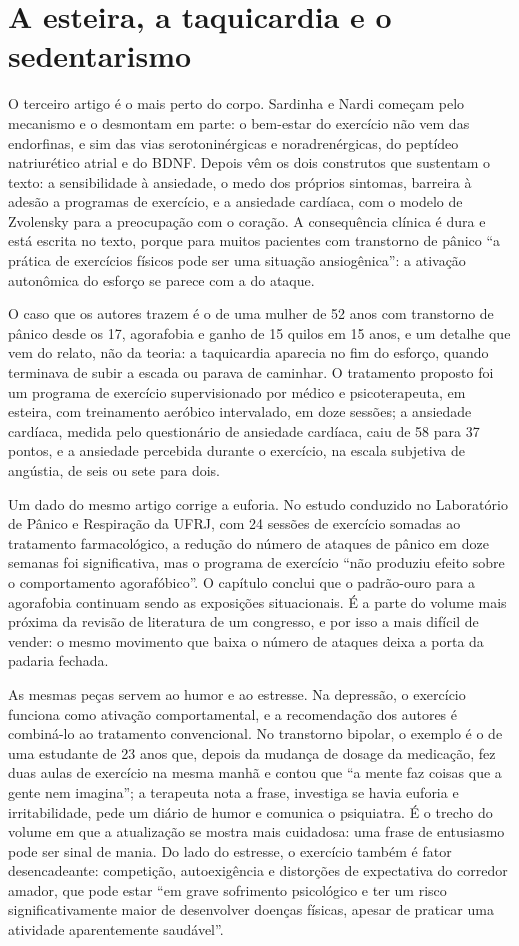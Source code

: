 \documentclass[12pt]{article}
\begin{document}
\section{A esteira, a taquicardia e o sedentarismo}

O terceiro artigo é o mais perto do corpo. Sardinha e Nardi começam pelo mecanismo e o desmontam em parte: o bem-estar do exercício não vem das endorfinas, e sim das vias serotoninérgicas e noradrenérgicas, do peptídeo natriurético atrial e do BDNF. Depois vêm os dois construtos que sustentam o texto: a sensibilidade à ansiedade, o medo dos próprios sintomas, barreira à adesão a programas de exercício, e a ansiedade cardíaca, com o modelo de Zvolensky para a preocupação com o coração. A consequência clínica é dura e está escrita no texto, porque para muitos pacientes com transtorno de pânico ``a prática de exercícios físicos pode ser uma situação ansiogênica'': a ativação autonômica do esforço se parece com a do ataque.

O caso que os autores trazem é o de uma mulher de 52 anos com transtorno de pânico desde os 17, agorafobia e ganho de 15 quilos em 15 anos, e um detalhe que vem do relato, não da teoria: a taquicardia aparecia no fim do esforço, quando terminava de subir a escada ou parava de caminhar. O tratamento proposto foi um programa de exercício supervisionado por médico e psicoterapeuta, em esteira, com treinamento aeróbico intervalado, em doze sessões; a ansiedade cardíaca, medida pelo questionário de ansiedade cardíaca, caiu de 58 para 37 pontos, e a ansiedade percebida durante o exercício, na escala subjetiva de angústia, de seis ou sete para dois.

Um dado do mesmo artigo corrige a euforia. No estudo conduzido no Laboratório de Pânico e Respiração da UFRJ, com 24 sessões de exercício somadas ao tratamento farmacológico, a redução do número de ataques de pânico em doze semanas foi significativa, mas o programa de exercício ``não produziu efeito sobre o comportamento agorafóbico''. O capítulo conclui que o padrão-ouro para a agorafobia continuam sendo as exposições situacionais. É a parte do volume mais próxima da revisão de literatura de um congresso, e por isso a mais difícil de vender: o mesmo movimento que baixa o número de ataques deixa a porta da padaria fechada.

As mesmas peças servem ao humor e ao estresse. Na depressão, o exercício funciona como ativação comportamental, e a recomendação dos autores é combiná-lo ao tratamento convencional. No transtorno bipolar, o exemplo é o de uma estudante de 23 anos que, depois da mudança de dosage da medicação, fez duas aulas de exercício na mesma manhã e contou que ``a mente faz coisas que a gente nem imagina''; a terapeuta nota a frase, investiga se havia euforia e irritabilidade, pede um diário de humor e comunica o psiquiatra. É o trecho do volume em que a atualização se mostra mais cuidadosa: uma frase de entusiasmo pode ser sinal de mania. Do lado do estresse, o exercício também é fator desencadeante: competição, autoexigência e distorções de expectativa do corredor amador, que pode estar ``em grave sofrimento psicológico e ter um risco significativamente maior de desenvolver doenças físicas, apesar de praticar uma atividade aparentemente saudável''.
\end{document}
